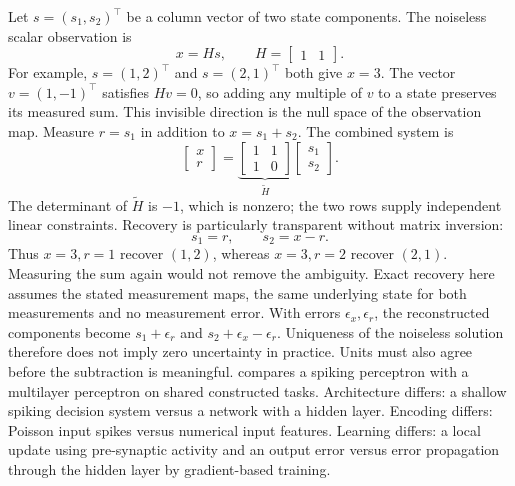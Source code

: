 Let $s=(s_1,s_2)^\top$ be a column vector of two state components. The noiseless scalar observation is
\[
x=Hs,\qquad H=\begin{bmatrix}1&1\end{bmatrix}.
\]
For example, $s=(1,2)^\top$ and $s=(2,1)^\top$ both give $x=3$. The vector $v=(1,-1)^\top$ satisfies $Hv=0$, so adding any multiple of $v$ to a state preserves its measured sum. This invisible direction is the null space of the observation map.
Measure $r=s_1$ in addition to $x=s_1+s_2$. The combined system is
\[
\begin{bmatrix}x\\r\end{bmatrix}
=\underbrace{\begin{bmatrix}1&1\\1&0\end{bmatrix}}_{\widetilde H}
\begin{bmatrix}s_1\\s_2\end{bmatrix}.
\]
The determinant of $\widetilde H$ is $-1$, which is nonzero; the two rows supply independent linear constraints. Recovery is particularly transparent without matrix inversion:
\[
s_1=r,\qquad s_2=x-r.
\]
Thus $x=3,r=1$ recover $(1,2)$, whereas $x=3,r=2$ recover $(2,1)$. Measuring the sum again would not remove the ambiguity.
Exact recovery here assumes the stated measurement maps, the same underlying state for both measurements and no measurement error. With errors $\epsilon_x,\epsilon_r$, the reconstructed components become $s_1+\epsilon_r$ and $s_2+\epsilon_x-\epsilon_r$. Uniqueness of the noiseless solution therefore does not imply zero uncertainty in practice. Units must also agree before the subtraction is meaningful.
 compares a spiking perceptron with a multilayer perceptron on shared constructed tasks. Architecture differs: a shallow spiking decision system versus a network with a hidden layer. Encoding differs: Poisson input spikes versus numerical input features. Learning differs: a local update using pre-synaptic activity and an output error versus error propagation through the hidden layer by gradient-based training.

